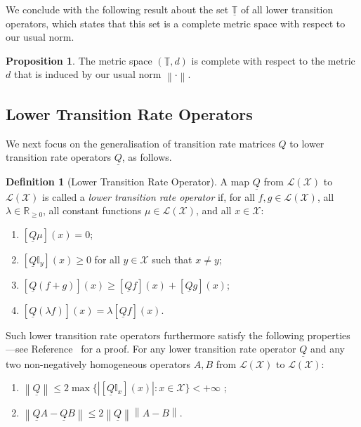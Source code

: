 \documentclass[10pt,a4paper]{paper}
\theoremstyle{definition}
\newtheorem{proposition}[theorem]{Proposition}
\newtheorem{definition}{Definition}
\newcommand{\reals}{\mathbb{R}}
\newcommand{\realsnonneg}{\reals_{\geq 0}}
\newcommand{\states}{\mathcal{X}}
\newcommand{\gambles}{\mathcal{L}}
\newcommand{\gamblesX}{\gambles(\states)}
\newcommand{\ind}[1]{\mathbb{I}_{#1}}
\newcommand{\lrate}{\underline{Q}}
\newcommand{\norm}[1]{\left\lVert #1 \right\rVert}
\newcommand{\abs}[1]{\left\vert #1 \right\vert}
\begin{document}
We conclude with the following result about the set $\underline{\mathbb{T}}$ of all lower transition operators, which states that this set is a complete metric space with respect to our usual norm.

\begin{proposition}\label{lemma:completemetricspace}
The metric space $(\underline{\mathbb{T}},d)$ is complete with respect to the metric $d$ that is induced by our usual norm $\norm{\cdot}$.
\end{proposition}

\subsection{Lower Transition Rate Operators}\label{sec:connections_rate}

We next focus on the generalisation of transition rate matrices $Q$ to lower transition rate operators $\lrate$, as follows.
\begin{definition}[Lower Transition Rate Operator]\label{def:coh_low_trans_rate}
A map $\lrate$ from $\gamblesX$ to $\gamblesX$ is called a \emph{lower transition rate operator} if, for all $f,g\in\gamblesX$, all $\lambda\in\realsnonneg$, all constant functions $\mu\in\gamblesX$, and all $x\in\states$:

\begin{enumerate}[label=LR\arabic*:,ref=LR\arabic*]
\item\label{LR:constantzero}
$\left[\lrate\mu\right](x)=0$;
\item\label{LR:nondiagpos}
$\left[\lrate\ind{y}\right](x)\geq0$ for all $y\in\states$ such that $x\neq y$;
\item\label{LR:subadditive}
$\left[\lrate(f+g)\right](x)\geq\left[\lrate f\right](x)+\left[\lrate g\right](x)$;
\item\label{LR:homo}
$\left[\lrate(\lambda f)\right](x)= \lambda\left[\lrate f\right](x)$.
\end{enumerate}
Such lower transition rate operators furthermore satisfy the following properties---see Reference~\cite{DeBock:2016} for a proof. For any lower transition rate operator $\lrate$ and any two non-negatively homogeneous operators $A,B$ from $\gamblesX$ to $\gamblesX$:
\begin{enumerate}[label=LR\arabic*:,ref=LR\arabic*,start=5]
\item
$\norm{\lrate}\leq 2\max\big\{\abs{[\lrate\ind{x}](x)}\colon x\in\states\big\} < +\infty$ \label{LR:normlratefinite};
\item
$\norm{\lrate A - \lrate B} \leq 2\norm{\lrate}\norm{A - B}.$ \label{LR:differenceofnorm}
\end{enumerate}
\vspace{0pt}
\end{definition}
\end{document}
